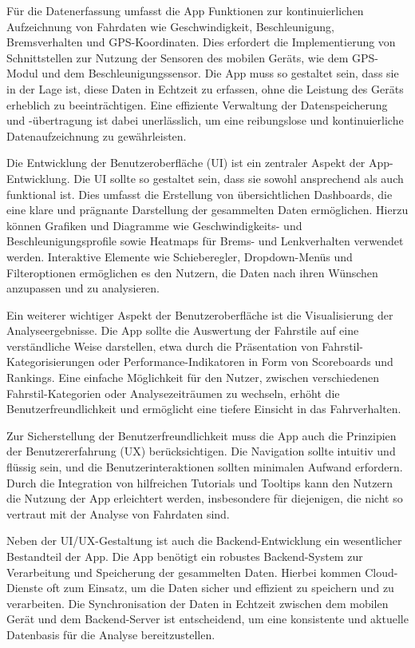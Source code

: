 \documentclass[oneside]{ausarbeitung}
\begin{document}
\begin{itemize}
  Für die Datenerfassung umfasst die App Funktionen zur kontinuierlichen Aufzeichnung von Fahrdaten wie Geschwindigkeit, Beschleunigung, Bremsverhalten und GPS-Koordinaten. Dies erfordert die Implementierung von Schnittstellen zur Nutzung der Sensoren des mobilen Geräts, wie dem GPS-Modul und dem Beschleunigungssensor. Die App muss so gestaltet sein, dass sie in der Lage ist, diese Daten in Echtzeit zu erfassen, ohne die Leistung des Geräts erheblich zu beeinträchtigen. Eine effiziente Verwaltung der Datenspeicherung und -übertragung ist dabei unerlässlich, um eine reibungslose und kontinuierliche Datenaufzeichnung zu gewährleisten.
  
  Die Entwicklung der Benutzeroberfläche (UI) ist ein zentraler Aspekt der App-Entwicklung. Die UI sollte so gestaltet sein, dass sie sowohl ansprechend als auch funktional ist. Dies umfasst die Erstellung von übersichtlichen Dashboards, die eine klare und prägnante Darstellung der gesammelten Daten ermöglichen. Hierzu können Grafiken und Diagramme wie Geschwindigkeits- und Beschleunigungsprofile sowie Heatmaps für Brems- und Lenkverhalten verwendet werden. Interaktive Elemente wie Schieberegler, Dropdown-Menüs und Filteroptionen ermöglichen es den Nutzern, die Daten nach ihren Wünschen anzupassen und zu analysieren.
  
  Ein weiterer wichtiger Aspekt der Benutzeroberfläche ist die Visualisierung der Analyseergebnisse. Die App sollte die Auswertung der Fahrstile auf eine verständliche Weise darstellen, etwa durch die Präsentation von Fahrstil-Kategorisierungen oder Performance-Indikatoren in Form von Scoreboards und Rankings. Eine einfache Möglichkeit für den Nutzer, zwischen verschiedenen Fahrstil-Kategorien oder Analysezeiträumen zu wechseln, erhöht die Benutzerfreundlichkeit und ermöglicht eine tiefere Einsicht in das Fahrverhalten.
  
  Zur Sicherstellung der Benutzerfreundlichkeit muss die App auch die Prinzipien der Benutzererfahrung (UX) berücksichtigen. Die Navigation sollte intuitiv und flüssig sein, und die Benutzerinteraktionen sollten minimalen Aufwand erfordern. Durch die Integration von hilfreichen Tutorials und Tooltips kann den Nutzern die Nutzung der App erleichtert werden, insbesondere für diejenigen, die nicht so vertraut mit der Analyse von Fahrdaten sind.
  
  Neben der UI/UX-Gestaltung ist auch die Backend-Entwicklung ein wesentlicher Bestandteil der App. Die App benötigt ein robustes Backend-System zur Verarbeitung und Speicherung der gesammelten Daten. Hierbei kommen Cloud-Dienste oft zum Einsatz, um die Daten sicher und effizient zu speichern und zu verarbeiten. Die Synchronisation der Daten in Echtzeit zwischen dem mobilen Gerät und dem Backend-Server ist entscheidend, um eine konsistente und aktuelle Datenbasis für die Analyse bereitzustellen.
  

\end{itemize}
\end{document}
